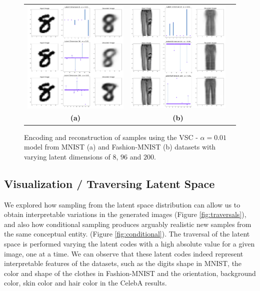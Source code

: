 \begin{figure}[!h]
    \centering
    \begin{tabular}{ccc}
    \includegraphics[width=.45\textwidth]{figures/latent_mnist_example} &
    \includegraphics[width=.45\textwidth]{figures/latent_fashion_example} \\
    \textbf{(a)}  & \textbf{(b)}   \\[6pt]
\end{tabular}
    \centering
    \caption{Encoding and reconstruction of samples using the VSC - $\alpha = 0.01$ model from MNIST (a) and Fashion-MNIST (b) datasets with varying latent dimensions of $8$, $96$ and $200$. }
    \label{fig:latent_dim}
\end{figure}

\subsection{Visualization / Traversing Latent Space}
We explored how sampling from the latent space distribution can allow us to obtain interpretable variations in the generated images (Figure \ref{fig:traversals}), and also how conditional sampling produces arguably realistic new samples from the same conceptual entity. (Figure \ref{fig:conditional}). The traversal of the latent space is performed varying the latent codes with a high absolute value for a given image, one at a time. We can observe that these latent codes indeed represent interpretable features of the datasets, such as the digits shape in MNIST, the color and shape of the clothes in Fashion-MNIST and the orientation, background color, skin color and hair color in the CelebA results.

